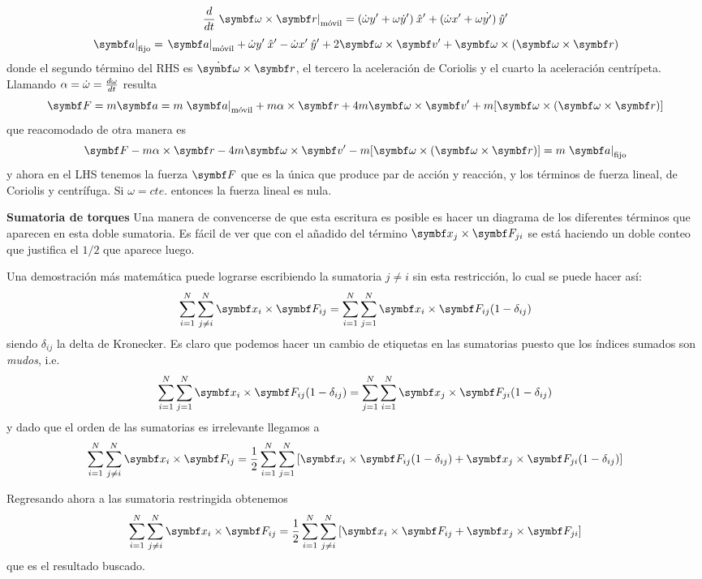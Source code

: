 \documentclass[10pt,oneside]{CBFT_book}
\begin{document}
\[
	\dtot{}{t}\left.\vb{\omega}\times\vb{r}\right|_\text{móvil} = 
	( \dot{\omega} y' + \omega \dot{y}' )\xver' + ( \dot{\omega} x' + \omega \dot{y'} )\yver'
\]
\[
	\left. \vb{a}\right|_\text{fijo} = \left. \vb{a}\right|_\text{móvil} +
	\dot{\omega}y'\xver'- \dot{\omega}x'\yver' + 2\vb{\omega}\times\vb{v'} + \vb{\omega}
	\times (\vb{\omega} \times \vb{r})
\]
donde el segundo término del RHS es $ \dot{\vb{\omega}} \times \vb{r}$, el tercero la aceleración de Coriolis y el 
cuarto la aceleración centrípeta.
Llamando $ \alpha = \dot{\omega} = \frac{d^{\hspace{-0.05em}} {\omega}}{d {t}^{\hspace{-0.05em}}}$ resulta 
\[
	\vb{F} = m\vb{a} = m \left. \vb{a}\right|_\text{móvil} + m \alpha \times \vb{r} + 4m 
	\vb{\omega}\times\vb{v'}+m[  \vb{\omega} \times (\vb{\omega}\times\vb{r} )]
\]
que reacomodado de otra manera es 
\[
	\vb{F} - m \alpha \times \vb{r} - 4m \vb{\omega}\times\vb{v'} - m[\vb{\omega} \times(\vb{\omega}\times\vb{r})]
	= m \left. \vb{a}\right|_\text{fijo}
\]
y ahora en el LHS tenemos la fuerza $\vb{F}$ que es la única que produce par de acción y reacción, y los términos de 
fuerza lineal, de Coriolis y centrífuga.
Si $\omega = cte.$ entonces la fuerza lineal es nula.


\begin{notasfinales}

\label{nota_suma_ineqj}
\item{ \bf Sumatoria de torques}
Una manera de convencerse de que esta escritura es posible es hacer un diagrama de los diferentes términos que
aparecen en esta doble sumatoria. Es fácil de ver que con el añadido del término $\vb{x}_j \times \vb{F}_{ji} $ se está 
haciendo un doble conteo que justifica el $1/2$ que aparece luego.

Una demostración más matemática puede lograrse escribiendo la sumatoria $ j\neq i $ sin esta restricción, lo cual se 
puede hacer así:
\[
	\Sum{i=1}{N} \Sum{j\neq i}{N}  \vb{x}_i \times \vb{F}_{ij} = 
	\Sum{i=1}{N} \Sum{j=1}{N}  \vb{x}_i \times \vb{F}_{ij} ( 1 - \delta_{ij} )
\]
siendo $ \delta_{ij} $ la delta de Kronecker. Es claro que podemos hacer un cambio de etiquetas en las sumatorias 
puesto que los índices sumados son {\it mudos}, i.e.
\[
	\Sum{i=1}{N} \Sum{j=1}{N}  \vb{x}_i \times \vb{F}_{ij} ( 1 - \delta_{ij} ) = 
	\Sum{j=1}{N} \Sum{i=1}{N}  \vb{x}_j \times \vb{F}_{ji} ( 1 - \delta_{ij} )
\]
y dado que el orden de las sumatorias es irrelevante llegamos a
\[
	\Sum{i=1}{N} \Sum{j\neq i}{N}  \vb{x}_i \times \vb{F}_{ij} = \frac{1}{2}
	\Sum{i=1}{N} \Sum{j=1}{N} \left[ \vb{x}_i \times \vb{F}_{ij} ( 1 - \delta_{ij} ) +
	\vb{x}_j \times \vb{F}_{ji} ( 1 - \delta_{ij} )
	\right] 
\]

Regresando ahora a las sumatoria restringida obtenemos 
\[
	\Sum{i=1}{N} \Sum{j\neq i}{N}  \vb{x}_i \times \vb{F}_{ij} = \frac{1}{2}
	\Sum{i=1}{N} \Sum{j \neq i }{N} \left[ \vb{x}_i \times \vb{F}_{ij} + \vb{x}_j \times \vb{F}_{ji} \right] 
\]
que es el resultado buscado.


\end{notasfinales}



\end{document}
